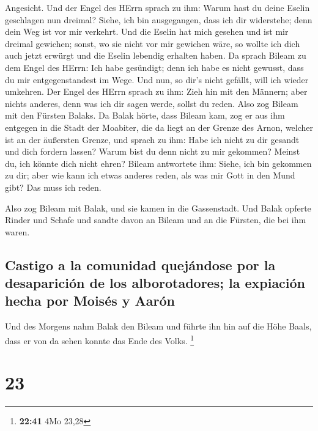 Angesicht.  Und der Engel des HErrn sprach zu ihm: Warum
hast du deine Eselin geschlagen nun dreimal? Siehe, ich bin ausgegangen,
dass ich dir widerstehe; denn dein Weg ist vor mir verkehrt.
 Und die Eselin hat mich gesehen und ist mir dreimal
gewichen; sonst, wo sie nicht vor mir gewichen wäre, so wollte ich dich
auch jetzt erwürgt und die Eselin lebendig erhalten haben.
 Da sprach Bileam zu dem Engel des HErrn: Ich habe
gesündigt; denn ich habe es nicht gewusst, dass du mir entgegenstandest
im Wege. Und nun, so dir's nicht gefällt, will ich wieder umkehren.
 Der Engel des HErrn sprach zu ihm: Zieh hin mit den
Männern; aber nichts anderes, denn was ich dir sagen werde, sollst du
reden. Also zog Bileam mit den Fürsten Balaks.  Da Balak
hörte, dass Bileam kam, zog er aus ihm entgegen in die Stadt der
Moabiter, die da liegt an der Grenze des Arnon, welcher ist an der
äußersten Grenze,  und sprach zu ihm: Habe ich nicht zu
dir gesandt und dich fordern lassen? Warum bist du denn nicht zu mir
gekommen? Meinst du, ich könnte dich nicht ehren?  Bileam
antwortete ihm: Siehe, ich bin gekommen zu dir; aber wie kann ich etwas
anderes reden, als was mir Gott in den Mund gibt? Das muss ich reden.

 Also zog Bileam mit Balak, und sie kamen in die
Gassenstadt.  Und Balak opferte Rinder und Schafe und
sandte davon an Bileam und an die Fürsten, die bei ihm waren.

\hypertarget{castigo-a-la-comunidad-quejuxe1ndose-por-la-desapariciuxf3n-de-los-alborotadores-la-expiaciuxf3n-hecha-por-moisuxe9s-y-aaruxf3n}{%
\subsection{Castigo a la comunidad quejándose por la desaparición de los
alborotadores; la expiación hecha por Moisés y
Aarón}\label{castigo-a-la-comunidad-quejuxe1ndose-por-la-desapariciuxf3n-de-los-alborotadores-la-expiaciuxf3n-hecha-por-moisuxe9s-y-aaruxf3n}}

 Und des Morgens nahm Balak den Bileam und führte ihn hin
auf die Höhe Baals, dass er von da sehen konnte das Ende des Volks.
\footnote{\textbf{22:41} 4Mo 23,28}

\hypertarget{section-22}{%
\section{23}\label{section-22}}

